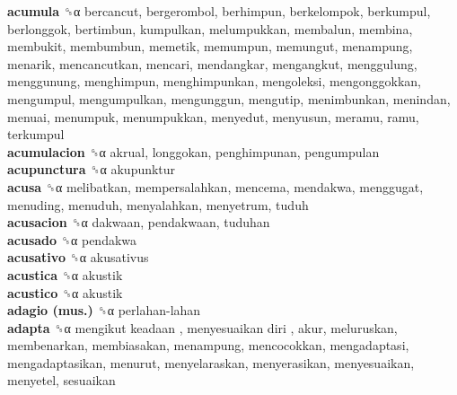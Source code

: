 \textbf{acumula} ␝α  bercancut, bergerombol, berhimpun, berkelompok, berkumpul, berlonggok, bertimbun, kumpulkan, melumpukkan, membalun, membina, membukit, membumbun, memetik, memumpun, memungut, menampung, menarik, mencancutkan, mencari, mendangkar, mengangkut, menggulung, menggunung, menghimpun, menghimpunkan, mengoleksi, mengonggokkan, mengumpul, mengumpulkan, mengunggun, mengutip, menimbunkan, menindan, menuai, menumpuk, menumpukkan, menyedut, menyusun, meramu, ramu, terkumpul  \\
\textbf{acumulacion} ␝α  akrual, longgokan, penghimpunan, pengumpulan  \\
\textbf{acupunctura} ␝α  akupunktur  \\
\textbf{acusa} ␝α  melibatkan, mempersalahkan, mencema, mendakwa, menggugat, menuding, menuduh, menyalahkan, menyetrum, tuduh  \\
\textbf{acusacion} ␝α  dakwaan, pendakwaan, tuduhan  \\
\textbf{acusado} ␝α  pendakwa  \\
\textbf{acusativo} ␝α  akusativus  \\
\textbf{acustica} ␝α  akustik  \\
\textbf{acustico} ␝α  akustik  \\
\textbf{adagio (mus.)} ␝α   perlahan-lahan   \\
\textbf{adapta} ␝α   mengikut keadaan ,  menyesuaikan diri , akur, meluruskan, membenarkan, membiasakan, menampung, mencocokkan, mengadaptasi, mengadaptasikan, menurut, menyelaraskan, menyerasikan, menyesuaikan, menyetel, sesuaikan  \\
